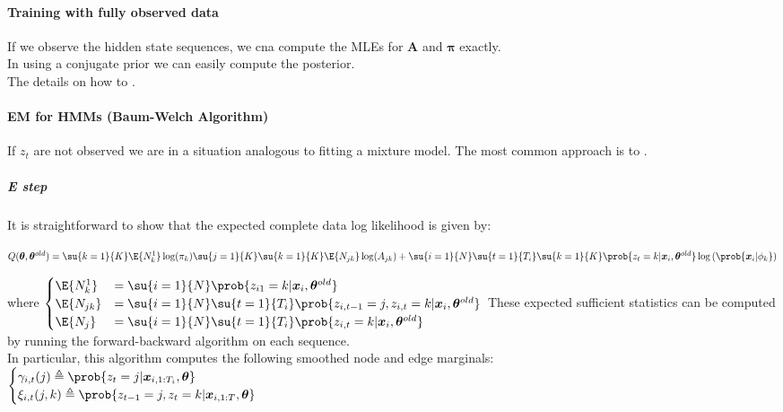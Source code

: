 \paragraph{Training with fully observed data}
If we observe the hidden state sequences, we cna compute the MLEs for $\bm{A}$ and $\bm{\pi}$ 
exactly. \\
In using a conjugate prior we can easily compute the posterior.\\
The details on how to .

\paragraph{EM for HMMs (Baum-Welch Algorithm)}
If $z_{t}$ are not observed we are in a situation analogous to fitting a mixture model.
The most common approach is to .

\subparagraph{E step}
It is straightforward to show that the expected complete data log likelihood is given by:
\begin{center}
    $Q(\bm{\theta},\bm{\theta}^{old}) = \su{k=1}{K}\E{N^{1}_{k}}\log(\pi_{k}) \su{j=1}{K}\su{k=1}{K}
        \E{N_{jk}}\log(A_{jk}) + \su{i=1}{N}\su{t=1}{T_{i}}\su{k=1}{K}\prob{z_{t}=k|\bm{x}_{i},
        \bm{\theta}^{old}}\log\left(\prob{\bm{x}_{i}|\phi_{k}}\right)$
\end{center}
where 
$\begin{cases}
    \E{N^{1}_{k}} &= \su{i=1}{N}\prob{z_{i1}=k|\bm{x}_{i},\bm{\theta}^{old}} \\
    \E{N_{jk}} &= \su{i=1}{N}\su{t=1}{T_{i}}\prob{z_{i,t-1}=j,z_{i,t}=k|\bm{x}_{i},\bm{\theta}^{
    old}} \\
            \E{N_{j}} &= \su{i=1}{N}\su{t=1}{T_{i}}\prob{z_{i,t}=k|\bm{x}_{i},\bm{\theta}^{old}}
\end{cases}$
These expected sufficient statistics can be computed by running the forward-backward algorithm on 
each sequence.\\
In particular, this algorithm computes the following smoothed node and edge marginals:\\
$\begin{cases}
    \gamma_{i,t}(j) \triangleq \prob{z_{t}=j|\bm{x}_{i,1:T_{i}},\bm{\theta}} \\
    \xi_{i,t}(j,k) \triangleq \prob{z_{t-1}=j,z_{t}=k|\bm{x}_{i,1:T},\bm{\theta}}
\end{cases}$

